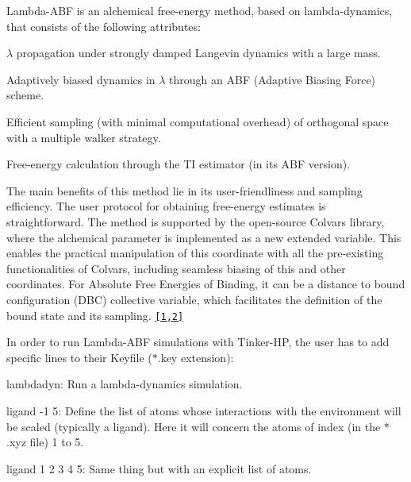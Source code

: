 \href{https://doi.org/10.1021/acs.jctc.3c01249}{\tt }

Lambda-\/\-A\-B\-F is an alchemical free-\/energy method, based on lambda-\/dynamics, that consists of the following attributes\-:


\begin{DoxyEnumerate}
\item $ \lambda $ propagation under strongly damped Langevin dynamics with a large mass.
\item Adaptively biased dynamics in $ \lambda $ through an A\-B\-F (Adaptive Biasing Force) scheme.
\item Efficient sampling (with minimal computational overhead) of orthogonal space with a multiple walker strategy.
\item Free-\/energy calculation through the T\-I estimator (in its A\-B\-F version).
\end{DoxyEnumerate}

The main benefits of this method lie in its user-\/friendliness and sampling efficiency. The user protocol for obtaining free-\/energy estimates is straightforward. The method is supported by the open-\/source Colvars library, where the alchemical parameter is implemented as a new extended variable. This enables the practical manipulation of this coordinate with all the pre-\/existing functionalities of Colvars, including seamless biasing of this and other coordinates. For Absolute Free Energies of Binding, it can be a distance to bound configuration (D\-B\-C) collective variable, which facilitates the definition of the bound state and its sampling. \href{#ref1}{\tt \mbox{[}1,2\mbox{]}} 



In order to run Lambda-\/\-A\-B\-F simulations with Tinker-\/\-H\-P, the user has to add specific lines to their Keyfile ({\ttfamily $\ast$.key} extension)\-:


\begin{DoxyItemize}
\item {\ttfamily lambdadyn}\-: Run a lambda-\/dynamics simulation.
\item {\ttfamily ligand -\/1 5}\-: Define the list of atoms whose interactions with the environment will be scaled (typically a ligand). Here it will concern the atoms of index (in the {\ttfamily $\ast$.xyz} file) 1 to 5.
\item {\ttfamily ligand 1 2 3 4 5}\-: Same thing but with an explicit list of atoms.
\end{DoxyItemize}

